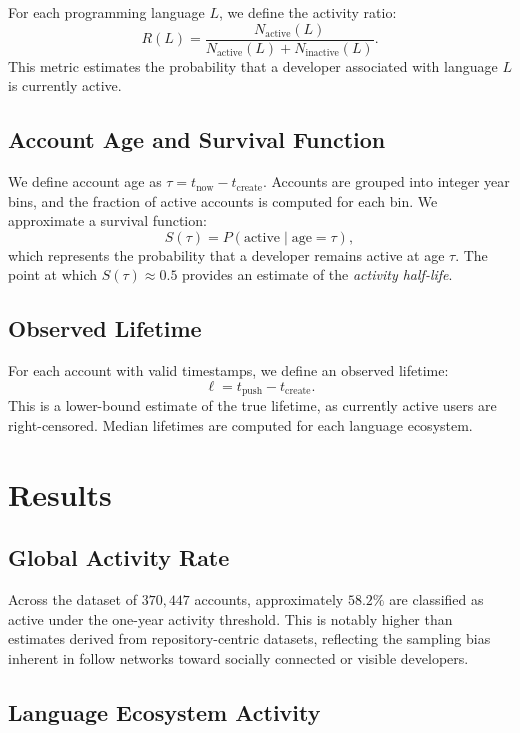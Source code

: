 \documentclass[12pt,a4paper]{article}
\begin{document}
For each programming language $L$, we define the activity ratio:
\[
R(L) = \frac{N_{\text{active}}(L)}{N_{\text{active}}(L) + N_{\text{inactive}}(L)}.
\]
This metric estimates the probability that a developer associated with language $L$ is currently active.

\subsection{Account Age and Survival Function}

We define account age as $\tau = t_{\text{now}} - t_{\text{create}}$. Accounts are grouped into integer year bins, and the fraction of active accounts is computed for each bin. We approximate a survival function:
\[
S(\tau) = P(\text{active} \mid \text{age} = \tau),
\]
which represents the probability that a developer remains active at age $\tau$. The point at which $S(\tau) \approx 0.5$ provides an estimate of the \emph{activity half-life}.

\subsection{Observed Lifetime}

For each account with valid timestamps, we define an observed lifetime:
\[
\ell = t_{\text{push}} - t_{\text{create}}.
\]
This is a lower-bound estimate of the true lifetime, as currently active users are right-censored. Median lifetimes are computed for each language ecosystem.

\section{Results}

\subsection{Global Activity Rate}

Across the dataset of $370{,}447$ accounts, approximately $58.2\%$ are classified as active under the one-year activity threshold. This is notably higher than estimates derived from repository-centric datasets, reflecting the sampling bias inherent in follow networks toward socially connected or visible developers.

\subsection{Language Ecosystem Activity}
\end{document}

